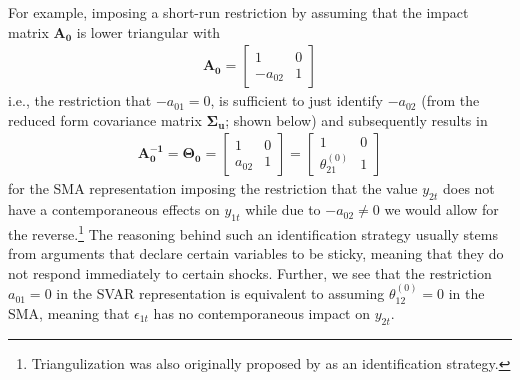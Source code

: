 \documentclass[a4paper,11pt,listof=nochaptergap,oneside,pointednumbers,bibtotoc,bigheadings,liststotoc,hidelinks]{scrbook}
\theoremstyle{mysatz}
\theoremstyle{mydefinition}
\theoremstyle{mytheorem}
\theoremstyle{mybemerkung}
\newcommand{\vect}[1]{\boldsymbol{\mathbf{#1}}}
\begin{document}
For example, imposing a short-run restriction by assuming that the impact matrix $\vect{A_0}$ is lower triangular with
\begin{equation} \label{eq:svar11}
\begin{split}
 		\vect{A_0} = 	\begin{bmatrix}
    					1 & 0 \\
					-a_{02} & 1
 					\end{bmatrix}
\end{split}								
\end{equation}
i.e., the restriction that $-a_{01}=0$, is sufficient to just identify $-a_{02}$ (from the reduced form covariance matrix $\vect{\Sigma_u}$; shown below) and subsequently results in 
\begin{equation} \label{eq:svar12}
\begin{split}
 		\vect{A_0^{-1}} = \vect{\Theta_0} = 	
					\begin{bmatrix}
    					1 & 0 \\
					a_{02} & 1
 					\end{bmatrix} = 
						\begin{bmatrix}
    						1 & 0 \\
						\theta_{21}^{(0)} & 1
 						\end{bmatrix}
\end{split}								
\end{equation}
for the SMA representation imposing the restriction that the value $y_{2t}$ does not have a contemporaneous effects on $y_{1t}$ while due to $-a_{02} \neq 0$ we would allow for the reverse.\footnote{Triangulization was also originally proposed by \citet{sims:80} as an identification strategy.} The reasoning behind such an identification strategy usually stems from arguments that declare certain variables to be sticky, meaning that they do not respond immediately to certain shocks. Further, we see that the restriction $a_{01}=0$ in the SVAR representation is equivalent to assuming $\theta_{12}^{(0)}=0$ in the SMA, meaning that $\epsilon_{1t}$ has no contemporaneous impact on $y_{2t}$.
\end{document}
